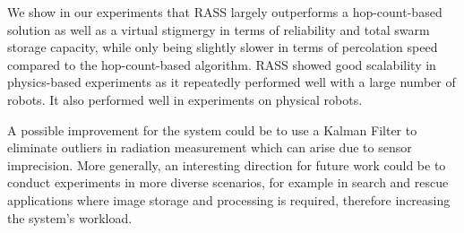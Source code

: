 We show in our experiments that \ac{RASS} largely outperforms a hop-count-based solution as well as a virtual stigmergy in terms of reliability and total swarm storage capacity, while only being slightly slower in terms of percolation speed compared to the hop-count-based algorithm. \ac{RASS} showed good scalability in physics-based experiments as it repeatedly performed well with a large number of robots. It also performed well in experiments on physical robots.

 A possible improvement for the system could be to use a Kalman Filter \cite{kalman1960new} to eliminate outliers in radiation measurement which can arise due to sensor imprecision. More generally, an interesting direction for future work could be to conduct experiments in more diverse scenarios, for example in search and rescue applications where image storage and processing is required, therefore increasing the system's workload.
